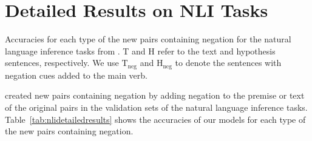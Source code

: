 \section{Detailed Results on NLI Tasks}
\label{app:nliresults}

\begin{table*}[h!]
    \centering
    
    \caption{
        Accuracies for each type of the new pairs containing negation for the natural language inference tasks from \citet{hossain-etal-2020-analysis}.
        T and H refer to the text and hypothesis sentences, respectively. We use $\text{T}_{\text{neg}}$ and $\text{H}_{\text{neg}}$ to denote the sentences with negation cues added to the main verb.
        \label{tab:nlidetailedresults}
    }
\end{table*}

\citet{hossain-etal-2020-analysis} created new pairs containing negation by adding negation to the premise or text of the original pairs in the validation sets of the natural language inference tasks.
Table~\ref{tab:nlidetailedresults} shows the accuracies of our models for each type of the new pairs containing negation.
